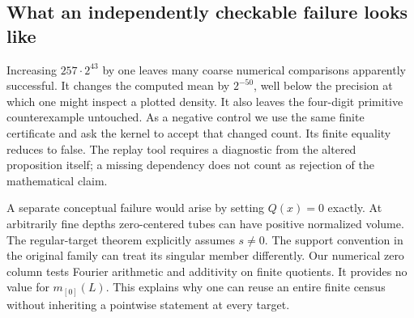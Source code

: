 \documentclass[12pt,letterpaper]{article}
\begin{document}
\subsection{What an independently checkable failure looks like}
Increasing $257\cdot2^{43}$ by one leaves many coarse numerical comparisons apparently successful. It changes the computed mean by $2^{-50}$, well below the precision at which one might inspect a plotted density. It also leaves the four-digit primitive counterexample untouched. As a negative control we use the same finite certificate and ask the kernel to accept that changed count. Its finite equality reduces to false. The replay tool requires a diagnostic from the altered proposition itself; a missing dependency does not count as rejection of the mathematical claim.
\par
A separate conceptual failure would arise by setting $Q(x)=0$ exactly. At arbitrarily fine depths zero-centered tubes can have positive normalized volume. The regular-target theorem explicitly assumes $s\ne0$. The support convention in the original family can treat its singular member differently. Our numerical zero column tests Fourier arithmetic and additivity on finite quotients. It provides no value for $m_{[0]}(L)$. This explains why one can reuse an entire finite census without inheriting a pointwise statement at every target.
\end{document}
